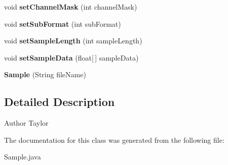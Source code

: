 \begin{DoxyCompactItemize}
\item 
\hypertarget{classSample_a8ffda9f961ce677ccd5247c445bb618b}{void {\bfseries set\-Channel\-Mask} (int channel\-Mask)}\label{classSample_a8ffda9f961ce677ccd5247c445bb618b}

\item 
\hypertarget{classSample_a4faae94bf8a8cc9092893d459d882313}{void {\bfseries set\-Sub\-Format} (int sub\-Format)}\label{classSample_a4faae94bf8a8cc9092893d459d882313}

\item 
\hypertarget{classSample_a94023089dcbeba91439ec81185b61144}{void {\bfseries set\-Sample\-Length} (int sample\-Length)}\label{classSample_a94023089dcbeba91439ec81185b61144}

\item 
\hypertarget{classSample_a18b8f2403e466518ed41d44a5d35c5d7}{void {\bfseries set\-Sample\-Data} (float\mbox{[}$\,$\mbox{]} sample\-Data)}\label{classSample_a18b8f2403e466518ed41d44a5d35c5d7}

\item 
\hypertarget{classSample_acbc5afe50eb34f006f9d71f77d2fae4e}{{\bfseries Sample} (String file\-Name)}\label{classSample_acbc5afe50eb34f006f9d71f77d2fae4e}

\end{DoxyCompactItemize}


\subsection{Detailed Description}
\begin{DoxyAuthor}{Author}
Taylor 
\end{DoxyAuthor}


The documentation for this class was generated from the following file\-:\begin{DoxyCompactItemize}
\item 
Sample.\-java\end{DoxyCompactItemize}
